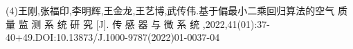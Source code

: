 \documentclass[preview]{standalone}
\begin{document}
\begin{center}
(4)王刚,张福印,李明辉,王金龙,王艺博,武传伟.基于偏最小二乘回归算法的空气 质 量 监 测 系 统 研 究 [J]. 传 感 器 与 微 系 统 ,2022,41(01):37-40+49.DOI:10.13873/J.1000-9787(2022)01-0037-04
\end{center}
\end{document}
